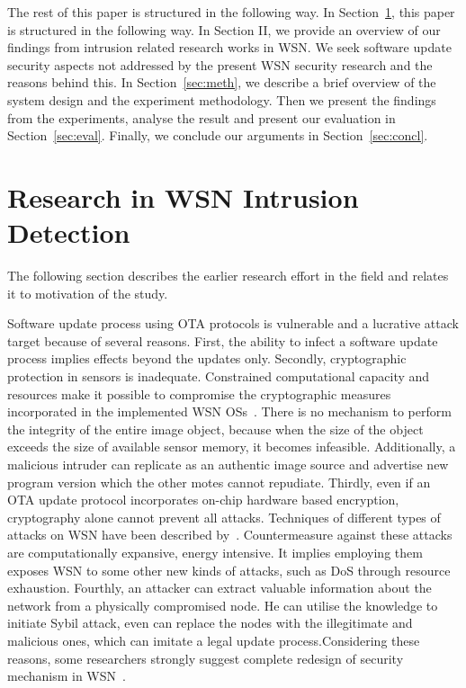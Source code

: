\documentclass[conference,manuscript]{IEEEtran}
\begin{document}
The rest of this paper is structured in the following way. 
In Section~\ref{sec:lit},  this paper is structured in the following way.
In Section II, we provide an overview of our findings from
intrusion related research works in WSN. We seek software
update security aspects not addressed by the present WSN
security research and the reasons behind this.  
In Section~\ref{sec:meth}, we describe a brief overview of the system design and the experiment methodology. Then we present the findings from the
experiments, analyse the result and present our evaluation in
Section~\ref{sec:eval}.  
Finally, we conclude our arguments in Section~\ref{sec:concl}.

\section{Research in WSN Intrusion Detection}
\label{sec:lit}

The following section describes the earlier research effort
in the field and relates it to motivation of the study.

Software update process using OTA protocols is vulnerable
and a lucrative attack target because of several reasons. First,
the ability to infect a software update process implies effects
beyond the updates only. Secondly, cryptographic protection in
sensors is inadequate. Constrained computational capacity and
resources make it possible to compromise the cryptographic
measures incorporated in the implemented WSN OSs~\cite{aes2011}.
There is no mechanism to perform the integrity of the entire
image object, because when the size of the object exceeds
the size of available sensor memory, it becomes infeasible.
Additionally, a malicious intruder can replicate as an authentic
image source and advertise new program version which the
other motes cannot repudiate. Thirdly, even if an OTA update protocol incorporates on-chip hardware based encryption,
cryptography alone cannot prevent all attacks. Techniques of
different types of attacks on WSN have been described by~\cite{DBLP:journals/corr/abs-1301-3022}. Countermeasure against these attacks are computationally
expansive, energy intensive. It implies employing them exposes
WSN to some other new kinds of attacks, such as DoS through
resource exhaustion. Fourthly, an attacker can extract valuable
information about the network from a physically compromised
node. He can utilise the knowledge to initiate Sybil attack, even
can replace the nodes with the illegitimate and malicious ones,
which can imitate a legal update process.Considering these
reasons, some researchers strongly suggest complete redesign
of security mechanism in WSN~\cite{quing09}.
\end{document}
